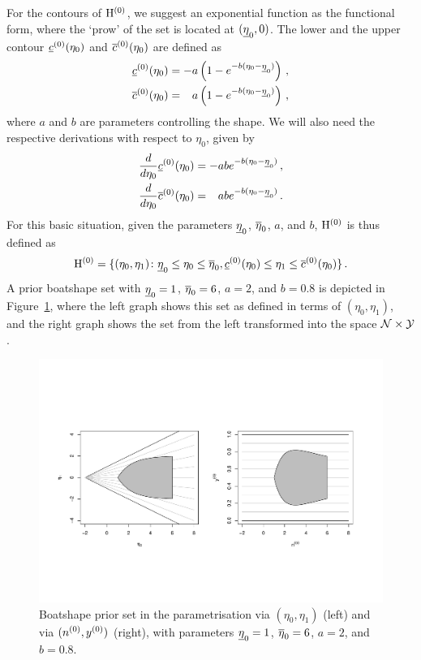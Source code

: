 For the contours of $\mathrm{H}^{(0)}$, we suggest an exponential function as the functional form,
where the `prow' of the set is located at $(\underline{\eta}_0, 0)$.
The lower and the upper contour $\underline{c}^{(0)}(\eta_0)$ and $\overline{c}^{(0)}(\eta_0)$ are defined as
\begin{align*}
\czl(\eta_0) &= -a \left( 1 - e^{-b(\eta_0 - \ezl)} \right)\,, \\
\czu(\eta_0) &= \phantom{-}%
                 a \left( 1 - e^{-b(\eta_0 - \ezl)} \right)\,, 
\end{align*}
where $a$ and $b$ are parameters controlling the shape.
We will also need the respective derivations with respect to $\eta_0$, given by
\begin{align*}
\frac{d}{d\eta_0} \czl(\eta_0) &= -ab e^{-b(\eta_0 - \ezl)}\,, \\
\frac{d}{d\eta_0} \czu(\eta_0) &= \phantom{-}%
                                   ab e^{-b(\eta_0 - \ezl)}\,.
\end{align*}
For this basic situation, given the parameters $\underline{\eta}_0$, $\overline{\eta}_0$, $a$, and $b$,
$\mathrm{H}^{(0)}$ is thus defined as
\begin{align}
\label{eq:basicset}
\mathrm{H}^{(0)} =
\{(\eta_0,\eta_1) \colon \underline{\eta}_0 \le \eta_0 \le \overline{\eta}_0, \underline{c}^{(0)}(\eta_0) \le  \eta_1 \le \overline{c}^{(0)}(\eta_0) \}\,.
\end{align}
A prior boatshape set with $\underline{\eta}_0=1$, $\overline{\eta}_0=6$, $a=2$, and $b=0.8$ is depicted in Figure~\ref{fig:boatshape-prior},
where the left graph shows this set as defined in terms of $(\eta_0,\eta_1)$,
and the right graph shows the set from the left transformed into the space $\mathcal{N} \times \mathcal{Y}$.

\begin{figure}  %
\centering
\includegraphics[trim = 15mm 45mm 25mm 60mm, clip, width=\textwidth]{R/boatshape-prior}%
\caption[Boatshape prior set in the parametrisation via $(\eta_0,\eta_1)$ and via $(\nz,\yz)$.]%
{Boatshape prior set in the parametrisation via $(\eta_0,\eta_1)$ (left) and via $(\nz,\yz)$ (right),
with parameters $\underline{\eta}_0=1$, $\overline{\eta}_0=6$, $a=2$, and $b=0.8$.}
\label{fig:boatshape-prior}
\end{figure}


